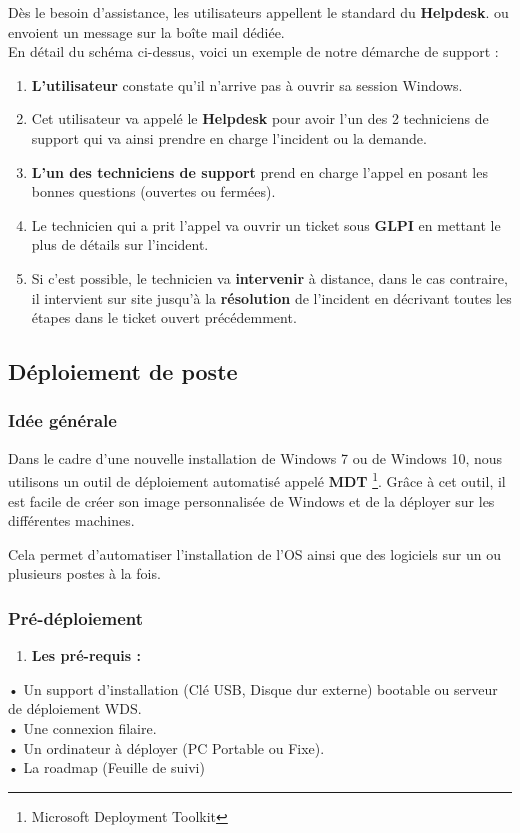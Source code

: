 \documentclass[11pt,a4paper,oneside]{article}
\begin{document}
Dès le besoin d'assistance, les utilisateurs appellent le standard du \textbf{Helpdesk}. ou envoient un message sur la boîte mail dédiée. \\

En détail du schéma ci-dessus, voici un exemple de notre démarche de support :

\begin{enumerate}
\item \textbf{L'utilisateur} constate qu'il n'arrive pas à ouvrir sa session Windows.
\item Cet utilisateur va appelé le \textbf{Helpdesk} pour avoir l'un des 2 techniciens de support qui va ainsi prendre en charge l'incident ou la demande.
\item \textbf{L'un des techniciens de support} prend en charge l'appel en posant les bonnes questions (ouvertes ou fermées).
\item Le technicien qui a prit l'appel va ouvrir un ticket sous \textbf{GLPI} en mettant le plus de détails sur l'incident.
\item  Si c'est possible, le technicien va \textbf{intervenir} à distance, dans le cas contraire, il intervient sur site jusqu'à la \textbf{résolution} de l'incident en décrivant toutes les étapes dans le ticket ouvert précédemment.
\end{enumerate}

\newpage

\subsection{Déploiement de poste}
\subsubsection{Idée générale}

Dans le cadre d’une nouvelle installation de Windows 7 ou de Windows 10, nous utilisons un outil de déploiement automatisé appelé \textbf{MDT} \footnote{Microsoft Deployment Toolkit}.
Grâce à cet outil, il est facile de créer son image personnalisée de Windows et de la déployer sur les différentes machines.

Cela permet d’automatiser l’installation de l’OS ainsi que des logiciels sur un ou plusieurs postes à la fois.
\subsubsection{Pré-déploiement}
\begin{enumerate}
    \item \textbf{Les pré-requis :}
\end{enumerate}
•	Un support d’installation (Clé USB, Disque dur externe) bootable ou serveur de déploiement WDS. \\
•	Une connexion filaire. \\
•	Un ordinateur à déployer (PC Portable ou Fixe). \\
•	La roadmap (Feuille de suivi)
\end{document}
